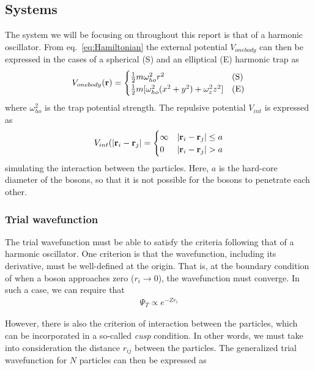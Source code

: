\documentclass[
    a4paper, aps, twocolumn, floatfix, superscriptaddress,
    nofootinbib]{revtex4-1}
\begin{document}
\subsection{Systems}
The system we will be focusing on throughout this report is that of a harmonic oscillator. From eq.~\eqref{eq:Hamiltonian} the external potential $V_{onebody}$ can then be expressed in the cases of a spherical (S) and an elliptical (E) harmonic trap as
\begin{align}
V_{onebody}(\bold{r}) = \begin{cases}
      \frac{1}{2}m\omega_{ho}^2r^2 & \text{(S)}\\
      \frac{1}{2}m[\omega_{ho}^2(x^2 + y^2) + \omega_z^2 z^2] & \text{(E)}
    \end{cases} \label{eq:V_ext}
\end{align}
where $\omega_{ho}^2$ is the trap potential strength. The repulsive potential $V_{int}$ is expressed as
\begin{align}
    V_{int}(|\bold{r}_i - \bold{r}_j| = \begin{cases}
    \infty &|\bold{r}_i - \bold r_j| \leq a \\
    0 & |\bold r_i - \bold r_j| > a
    \end{cases} \label{eq:V_int}
\end{align}
simulating the interaction between the particles. Here, $a$ is the hard-core diameter of the bosons, so that it is not possible for the bosons to penetrate each other.
\subsubsection{Trial wavefunction} The trial wavefunction must be able to satisfy the criteria following that of a harmonic oscillator. One criterion is that the wavefunction, including its derivative, must be well-defined at the origin. That is, at the boundary condition of when a boson approaches zero ($r_{i}\rightarrow 0$), the wavefunction must converge. In such a case, we can require that
\begin{align}
    \Psi_T \propto e^{-Zr_i} \label{eq:psi_T_boundary_condition}
\end{align}

However, there is also the criterion of interaction between the particles, which can be incorporated in a so-called \textit{cusp} condition. In other words, we must take into consideration the distance $r_{ij}$ between the particles. The generalized trial wavefunction for $N$ particles can then be expressed as
\end{document}
